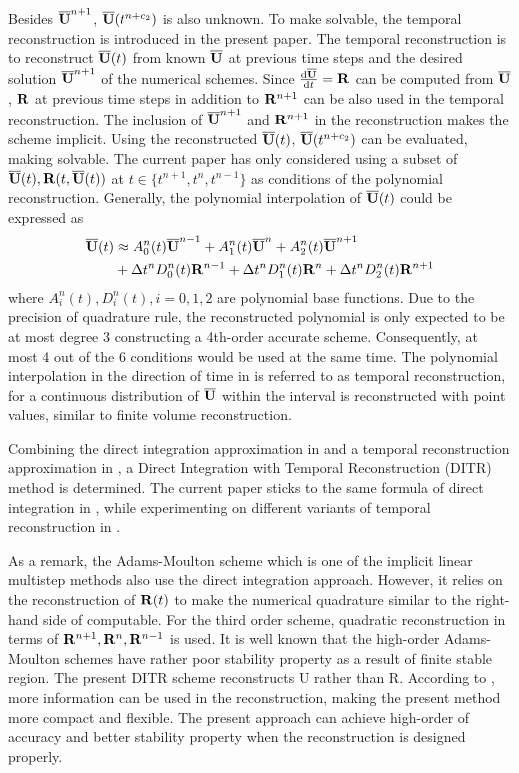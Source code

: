 Besides $\overline{\mathbf{U}}^{n+1}$, $\overline{\mathbf{U}}(t^{n+c_2})$ is also unknown.
To make 
solvable, the temporal reconstruction is introduced in the
present paper.
The temporal reconstruction is to reconstruct $\overline{\mathbf{U}}(t)$
from known $\overline{\mathbf{U}}$ at previous time steps and the desired
solution $\overline{\mathbf{U}}^{n+1}$ of the numerical schemes. Since $\frac{\dd\overline{\mathbf{U}}}{\dd t}=\mathbf{R}$
can be computed from  $\overline{\mathbf{U}}$, $\mathbf{R}$ at previous time steps in
addition to $\mathbf{R}^{n+1}$ can be also used in the temporal reconstruction.
The inclusion of $\overline{\mathbf{U}}^{n+1}$ and $\mathbf{R}^{n+1}$ in the reconstruction
makes the scheme implicit.
Using the reconstructed $\overline{\mathbf{U}}(t)$, $\overline{\mathbf{U}}(t^{n+c_2})$
can be evaluated, making  solvable.
The current paper has only considered using a subset of
$\overline{\mathbf{U}}(t), \mathbf{R}(t, \overline{\mathbf{U}}(t))$ at $t \in \{t^{n+1}, t^n, t^{n-1}\}$
as conditions of the polynomial reconstruction.
Generally, the polynomial interpolation
of $\overline{\mathbf{U}}(t)$ could be expressed as
\begin{equation}
    \begin{aligned}
        \label{eq:TR}
        \overline{\mathbf{U}}(t) & \approx
        A^n_0(t)\overline{\mathbf{U}}^{n - 1} +
        A^n_1(t)\overline{\mathbf{U}}^{n} +
        A^n_2(t)\overline{\mathbf{U}}^{n + 1}
        \\ & +
        {\Delta} t^n D^n_0(t)\mathbf{R}^{n - 1} +
        {\Delta} t^n D^n_1(t)\mathbf{R}^{n} +
        {\Delta} t^n D^n_2(t)\mathbf{R}^{n + 1}
    \end{aligned}
\end{equation}
where $A^n_i(t), D^n_i(t), i=0,1,2$
are polynomial base functions.
Due to the precision of quadrature rule,
the reconstructed polynomial is only expected to be at most degree 3
constructing a 4th-order accurate scheme.
Consequently, at most 4 out of the
6 conditions would be used at the same time.
The polynomial interpolation in the direction of time in 
is referred to as temporal reconstruction, for
a continuous distribution of $\overline{\mathbf{U}}$ within the interval
is reconstructed with point values,
similar to finite volume reconstruction.

Combining the direct integration approximation in 
and a temporal reconstruction approximation in ,
a Direct Integration with Temporal Reconstruction (DITR) method is
determined.
The current paper sticks to the same formula of direct integration
in , while experimenting on different
variants of temporal reconstruction in .

As a remark, the Adams-Moulton scheme which is one of the
implicit linear multistep methods also use the direct
integration approach.
However, it relies on the
reconstruction of $\mathbf{R}(t)$ to make the numerical quadrature
similar to the right-hand side of  computable.
For the third order scheme, quadratic reconstruction in terms
of $\mathbf{R}^{n+1},\mathbf{R}^{n},\mathbf{R}^{n-1}$ is used.
It is well known that the high-order
Adams-Moulton schemes have rather poor stability
property as a result of finite stable region.
The present DITR scheme reconstructs U rather
than R. According to ,
more information can be used
in the reconstruction, making the present method more
compact and flexible. The present approach can achieve
high-order of accuracy and better stability property when
the reconstruction is designed properly.

